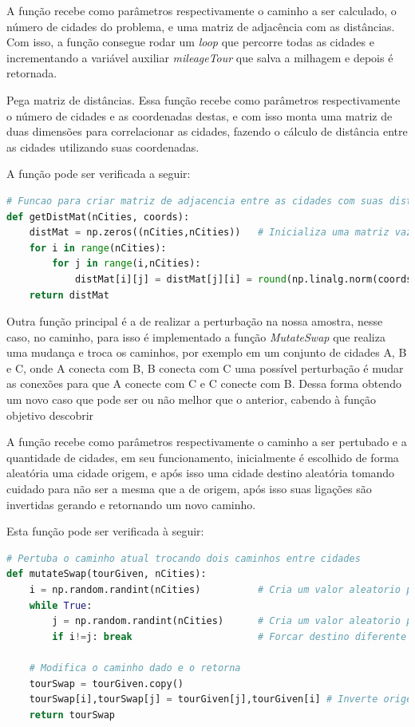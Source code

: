\documentclass{article}
\begin{document}
A função recebe como parâmetros respectivamente o caminho a ser calculado, o número de cidades do problema, e uma matriz de adjacência com as distâncias. Com isso, a função consegue rodar um \textit{loop} que percorre todas as cidades e incrementando a variável auxiliar \textit{mileageTour} que salva a milhagem e depois é retornada.

Pega matriz de distâncias. Essa função recebe como parâmetros respectivamente o número de cidades e as coordenadas destas, e com isso monta uma matriz de duas dimensões para correlacionar as cidades, fazendo o cálculo de distância entre as cidades utilizando suas coordenadas. 

A função pode ser verificada a seguir:

\begin{lstlisting}[language=Python, caption={Função de criação de matriz de adjacência.}]
# Funcao para criar matriz de adjacencia entre as cidades com suas distancias
def getDistMat(nCities, coords):
    distMat = np.zeros((nCities,nCities))   # Inicializa uma matriz vazia
    for i in range(nCities):
        for j in range(i,nCities):
            distMat[i][j] = distMat[j][i] = round(np.linalg.norm(coords[i]-coords[j]))
    return distMat  
\end{lstlisting}

Outra função principal é a de realizar a perturbação na nossa amostra, nesse caso, no caminho, para isso é implementado a função \textit{MutateSwap} que realiza uma mudança e troca os caminhos, por exemplo em um conjunto de cidades {A, B e C}, onde A conecta com B, B conecta com C uma possível perturbação é mudar as conexões para que A conecte com C e C conecte com B. Dessa forma obtendo um novo caso que pode ser ou não melhor que o anterior, cabendo à função objetivo descobrir

A função recebe como parâmetros respectivamente o caminho a ser pertubado e a quantidade de cidades, em seu funcionamento, inicialmente é escolhido de forma aleatória uma cidade origem, e após isso uma cidade destino aleatória tomando cuidado para não ser a mesma que a de origem, após isso suas ligações são invertidas gerando e retornando um novo caminho.

Esta função pode ser verificada à seguir:

\begin{lstlisting}[language=Python, caption={Função de criação de matriz de adjacência.}]
# Pertuba o caminho atual trocando dois caminhos entre cidades
def mutateSwap(tourGiven, nCities):
    i = np.random.randint(nCities)          # Cria um valor aleatorio para cidade origem
    while True:
        j = np.random.randint(nCities)      # Cria um valor aleatorio para cidade destino
        if i!=j: break                      # Forcar destino diferente de origem 

    # Modifica o caminho dado e o retorna
    tourSwap = tourGiven.copy()       
    tourSwap[i],tourSwap[j] = tourGiven[j],tourGiven[i] # Inverte origem e destino
    return tourSwap
\end{lstlisting}
\end{document}

